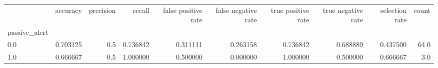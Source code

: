 \begin{tabular}{lrrrrrrrrr}
\toprule
{} &  accuracy &  precision &    recall &  false positive rate &  false negative rate &  true positive rate &  true negative rate &  selection rate &  count \\
passive\_alert &           &            &           &                      &                      &                     &                     &                 &        \\
\midrule
0.0           &  0.703125 &        0.5 &  0.736842 &             0.311111 &             0.263158 &            0.736842 &            0.688889 &        0.437500 &   64.0 \\
1.0           &  0.666667 &        0.5 &  1.000000 &             0.500000 &             0.000000 &            1.000000 &            0.500000 &        0.666667 &    3.0 \\
\bottomrule
\end{tabular}
